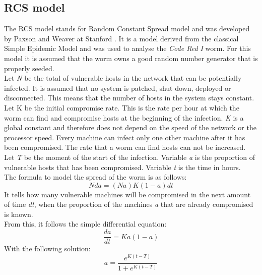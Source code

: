 \subsection{RCS model}

The RCS model stands for Random Constant Spread model and was developed by Paxson and Weaver at Stanford \citep{OwnInternetSI}. It is a model derived from the classical Simple Epidemic Model and was used to analyse the \textit{Code Red I} worm. For this model it is assumed that the worm owns a good random number generator that is properly seeded. \\

Let\textit{ N} be the total of vulnerable hosts in the network that can be potentially infected. It is assumed that no system is patched, shut down, deployed or disconnected. This means that the number of hosts in the system stays constant. 
Let K be the initial compromise rate. This is the rate per hour at which the worm can find and compromise hosts at the beginning of the infection. \textit{K} is a global constant and therefore does not depend on the speed of the network or the processor speed.  Every machine can infect only one other machine after it has been compromised. The rate that a worm can find hosts can not be increased. 
Let \textit{T} be the moment of the start of the infection. Variable \textit{a} is the proportion of vulnerable hosts that has been compromised. Variable \textit{t} is the time in hours. \\

The formula to model the spread of the worm is as follows:
\begin{equation}
N da = (N a)K(1 - a)dt
\end{equation}
It tells how many vulnerable machines will be compromised in the next amount of time \textit{dt}, when the proportion of the machines \textit{a} that are already compromised is known.\\

From this, it follows the simple differential equation:
\begin{equation}
\dfrac{d a}{dt} = Ka(1-a)
\end{equation}
With the following solution:
\begin{equation}
a = \dfrac{e^{K(t-T)}}{1+e^{K(t-T)}}
\end{equation}
\\

